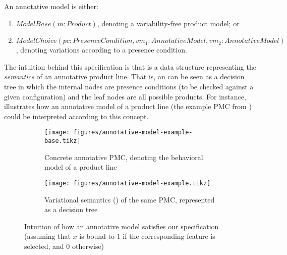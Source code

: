 \begin{definition}
\label{defn:annotative-model}
An annotative model is either:
\begin{enumerate}
    \item $ModelBase(m:Product)$, denoting a variability-free product model; or
    \item $ModelChoice(pc:PresenceCondition, vm_1:AnnotativeModel, vm_2:AnnotativeModel)$, denoting variations according to a presence condition. 
\end{enumerate}
\end{definition} 

The intuition behind this specification is that  is a data structure representing the \emph{semantics} of an annotative product line.
That is, an  can be seen as a decision tree in which the internal nodes are presence conditions (to be checked against a given configuration) and the leaf nodes are all possible products.
For instance,  illustrates how an annotative model of a product line (the example PMC from ) could be interpreted according to this concept.

\begin{figure}[!htbp]
	\centering
	\begin{subfigure}[t]{\textwidth}
	\centering
	    \texttt{[image: figures/annotative-model-example-base.tikz]}
	    \caption{Concrete annotative PMC, denoting the behavioral model of a product line}
	\end{subfigure}
	\begin{subfigure}[t]{\textwidth}
	\centering
	    \texttt{[image: figures/annotative-model-example.tikz]}
	    \caption{Variational semantics () of the same PMC, represented as a decision tree}
	\end{subfigure}
	\caption{Intuition of how an annotative model satisfies our specification (assuming that $x$ is bound to $1$ if the corresponding feature is selected, and $0$ otherwise)}
	\label{fig:annotative-model-example}
\end{figure}

